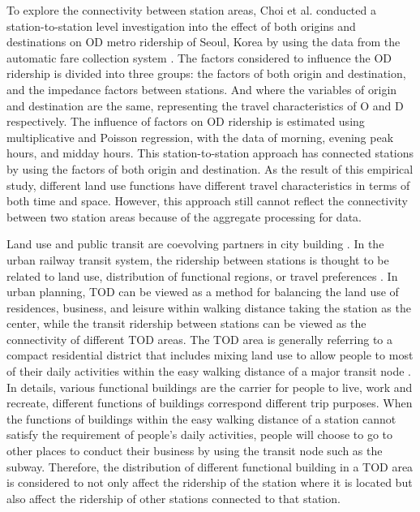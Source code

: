%
To explore the connectivity between station areas, Choi et al. conducted a station-to-station level investigation into the effect of both origins and destinations on OD metro ridership of Seoul, Korea by using the data from the automatic fare collection system \cite{choi2012analysis}. The factors considered to influence the OD ridership is divided into three groups: the factors of both origin and destination, and the impedance factors between stations. And where the variables of origin and destination are the same, representing the travel characteristics of O and D respectively. The influence of factors on OD ridership is estimated using multiplicative and Poisson regression, with the data of morning, evening peak hours, and midday hours. This station-to-station approach has connected stations by using the factors of both origin and destination. As the result of this empirical study, different land use functions have different travel characteristics in terms of both time and space. However, this approach still cannot reflect the connectivity between two station areas because of the aggregate processing for data.

%
Land use and public transit are coevolving partners in city building \cite{handy2005smart,dittmar2012new}. In the urban railway transit system, the ridership between stations is thought to be related to land use, distribution of functional regions, or travel preferences \cite{thompson1997achieving}. In urban planning, TOD can be viewed as a method for balancing the land use of residences, business, and leisure within walking distance taking the station as the center, while the transit ridership between stations can be viewed as the connectivity of different TOD areas. The TOD area is generally referring to a compact residential district that includes mixing land use to allow people to most of their daily activities within the easy walking distance of a major transit node \cite{lund2004travel}. In details, various functional buildings are the carrier for people to live, work and recreate, different functions of buildings correspond different trip purposes. When the functions of buildings within the easy walking distance of a station cannot satisfy the requirement of people’s daily activities, people will choose to go to other places to conduct their business by using the transit node such as the subway. Therefore, the distribution of different functional building in a TOD area is considered to not only affect the ridership of the station where it is located but also affect the ridership of other stations connected to that station.

